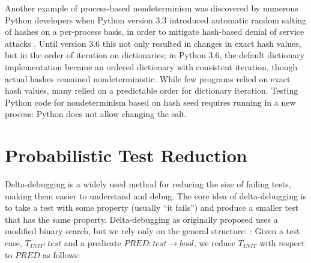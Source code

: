 Another example of process-based nondeterminism was discovered by numerous Python developers when Python
version 3.3 introduced automatic random salting of hashes on a
per-process basis,
in order to mitigate hash-based denial of service attacks
\cite{denial}.  Until version 3.6 this not only resulted in changes in
exact hash values, but in the order of iteration on
dictionaries; in Python 3.6, the default dictionary implementation became an ordered dictionary with consistent iteration, though actual hashes remained nondeterministic.  While few programs relied on exact hash values, many
relied on a
predictable order for dictionary iteration.  Testing
Python code for nondeterminism based on hash seed requires
running in a new process:  Python does not allow changing the salt.



\section{Probabilistic Test Reduction}

Delta-debugging \cite{DD}  is a widely used method for reducing the
size of failing tests, making them easier to understand and debug.
The core idea of delta-debugging is to take a test with some
property (usually ``it fails'')
and produce a smaller test that has the same property.
Delta-debugging as originally proposed uses a
modified binary search, but we rely only on the general structure: \cite{CReduce,onetest}:  Given a
test case, $T_{\mathit{INIT}} : \mathit{test}$ and a predicate
$\mathit{PRED}: \mathit{test} \rightarrow \mathit{bool}$, we
reduce $T_{\mathit{INIT}}$ with respect to $\mathit{PRED}$
as follows:


